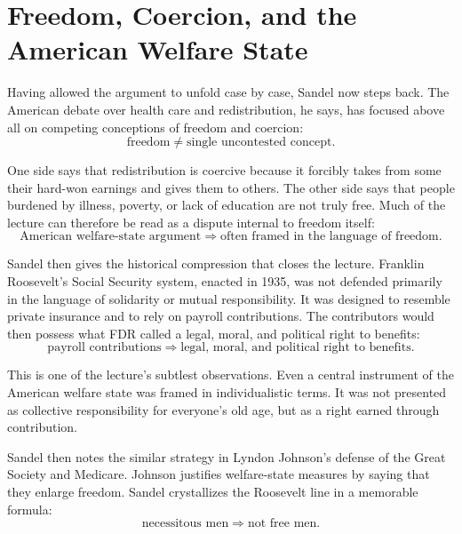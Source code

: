 \section{Freedom, Coercion, and the American Welfare State}

Having allowed the argument to unfold case by case, Sandel now steps back. The American debate over health care and redistribution, he says, has focused above all on competing conceptions of freedom and coercion:
\begin{equation}
\text{freedom}
\neq
\text{single uncontested concept}.
\end{equation}

One side says that redistribution is coercive because it forcibly takes from some their hard-won earnings and gives them to others. The other side says that people burdened by illness, poverty, or lack of education are not truly free. Much of the lecture can therefore be read as a dispute internal to freedom itself:
\begin{equation}
\text{American welfare-state argument}
\Longrightarrow
\text{often framed in the language of freedom}.
\end{equation}

Sandel then gives the historical compression that closes the lecture. Franklin Roosevelt's Social Security system, enacted in 1935, was not defended primarily in the language of solidarity or mutual responsibility. It was designed to resemble private insurance and to rely on payroll contributions. The contributors would then possess what FDR called a legal, moral, and political right to benefits:
\begin{equation}
\text{payroll contributions}
\Longrightarrow
\text{legal, moral, and political right to benefits}.
\end{equation}

This is one of the lecture's subtlest observations. Even a central instrument of the American welfare state was framed in individualistic terms. It was not presented as collective responsibility for everyone's old age, but as a right earned through contribution.

Sandel then notes the similar strategy in Lyndon Johnson's defense of the Great Society and Medicare. Johnson justifies welfare-state measures by saying that they enlarge freedom. Sandel crystallizes the Roosevelt line in a memorable formula:
\begin{equation}
\text{necessitous men}
\Longrightarrow
\text{not free men}.
\end{equation}

